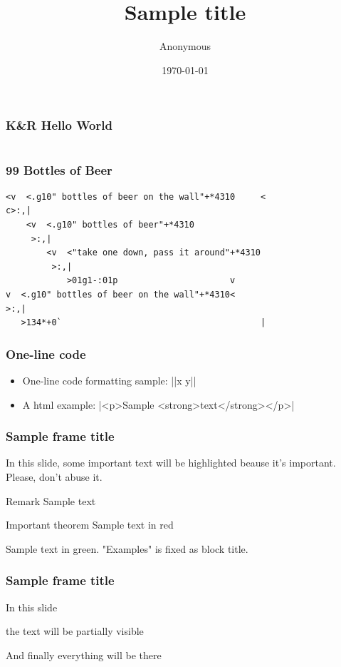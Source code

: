 \documentclass[10pt]{beamer}
\title{Sample title}
\author{Anonymous}
\institute{Faculty of Physics\\
  Some University}
\date{\today}
\newlength{\wideitemsep}
\let\olditem\item
\renewcommand{\item}{\setlength{\itemsep}{\wideitemsep}\olditem}
\begin{document}
\frame{\titlepage}

\begin{frame}[fragile]
\frametitle{K\&R Hello World}
\inputminted{c}{hello.c}
\end{frame}

\begin{frame}[fragile]
    \frametitle{99 Bottles of Beer}
\begin{verbatim}
<v  <.g10" bottles of beer on the wall"+*4310     <
c>:,|
    <v  <.g10" bottles of beer"+*4310
     >:,|
        <v  <"take one down, pass it around"+*4310
         >:,|
            >01g1-:01p                      v
v  <.g10" bottles of beer on the wall"+*4310<
>:,|
   >134*+0`                                       |
\end{verbatim}
\end{frame}

\begin{frame}
\frametitle{One-line code}
\begin{itemize}
\item One-line code formatting sample: 
|{|x \Rightarrow y|}|
\item A html example:
|<p>Sample <strong>text</strong></p>|
\end{itemize}
\end{frame}

\begin{frame}
\frametitle{Sample frame title}
 
In this slide, some important text will be
\alert{highlighted} beause it's important.
Please, don't abuse it.
 
\begin{block}{Remark}
Sample text
\end{block}
 
\begin{alertblock}{Important theorem}
Sample text in red 
\end{alertblock}
 
\begin{examples}
Sample text in green. "Examples" is fixed as block title.
\end{examples}
\end{frame}

{
\begin{frame}
\frametitle{Sample frame title}
 In this slide \pause
 
 the text will be partially visible \pause
 
 And finally everything will be there
\end{frame}
}
\end{document}
